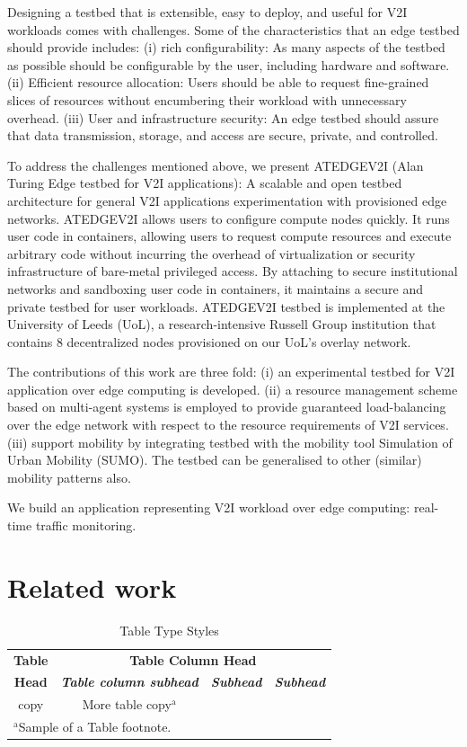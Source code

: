 \documentclass[conference]{IEEEtran}
\begin{document}
\par Designing a testbed that is extensible, easy to deploy, and useful for V2I workloads comes with challenges. 
Some of the characteristics that an edge testbed should provide\cite{boubin2022prowess} includes: 
(i) rich configurability: As many aspects of the testbed as possible should be configurable by the user, including hardware and software. (ii) Efficient resource allocation: Users should be able to request fine-grained slices of resources without encumbering their workload with unnecessary overhead. (iii) User and infrastructure security: An edge testbed should assure that data transmission, storage, and access are secure, private, and controlled.
\par To address the challenges mentioned above, we present ATEDGEV2I (Alan Turing Edge testbed for V2I applications): A scalable and open testbed architecture for general V2I applications experimentation with provisioned edge networks. ATEDGEV2I allows users to configure compute nodes quickly. It runs user code in containers, allowing users to request compute resources and execute arbitrary code without incurring the overhead of virtualization or security infrastructure of bare-metal privileged access. By attaching to secure institutional networks and sandboxing user code in containers, it maintains a secure and private testbed for user workloads. ATEDGEV2I testbed is implemented at the University of Leeds (UoL), a research-intensive Russell Group institution that contains 8 decentralized nodes provisioned on our UoL's overlay network.
\par The contributions of this work are three fold: (i) an experimental testbed for V2I application over edge computing is developed. (ii) a resource management scheme based on multi-agent systems is employed to provide guaranteed load-balancing over the edge network with respect to the resource requirements of V2I services.
(iii) support mobility by integrating testbed with the mobility tool Simulation of Urban Mobility (SUMO)\cite{behrisch2011sumo}. The testbed can be generalised to other (similar) mobility patterns also.

We build an application representing V2I workload over edge computing: real-time traffic monitoring.

\section{Related work}
\begin{table}[htbp]
\caption{Table Type Styles}
\begin{center}
\begin{tabular}{|c|c|c|c|}
\hline
\textbf{Table}&\multicolumn{3}{|c|}{\textbf{Table Column Head}} \\
\cline{2-4} 
\textbf{Head} & \textbf{\textit{Table column subhead}}& \textbf{\textit{Subhead}}& \textbf{\textit{Subhead}} \\
\hline
copy& More table copy$^{\mathrm{a}}$& &  \\
\hline
\multicolumn{4}{l}{$^{\mathrm{a}}$Sample of a Table footnote.}
\end{tabular}
\label{tab1}
\end{center}
\end{table}
\end{document}
